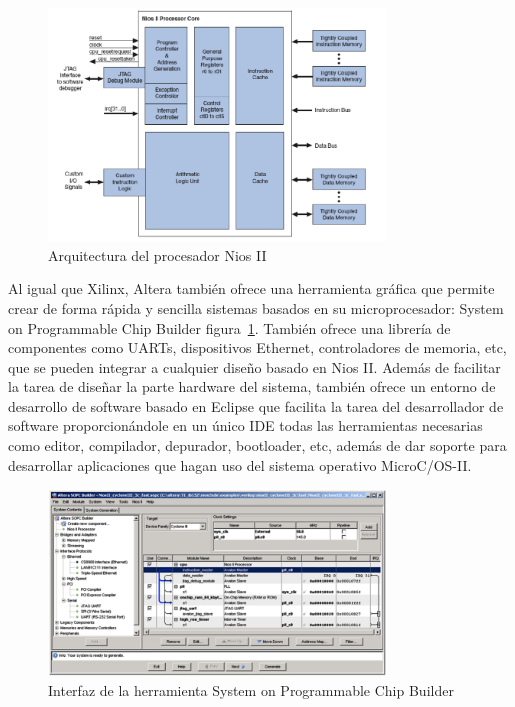 \begin{figure}[h!]
 	\begin{center}
  	\includegraphics[width=0.8\textwidth,keepaspectratio=true]{./images/nios2}
  	\caption{Arquitectura del procesador Nios II}
 	\end{center}
	\end{figure}

Al igual que Xilinx, Altera también ofrece una herramienta gráfica que permite crear de forma rápida y sencilla sistemas basados en su microprocesador: System on Programmable Chip Builder \cite{Etiqueta28}figura~\ref{fig:System on Programmable Chip Builder}. También ofrece una librería de componentes como UARTs, dispositivos Ethernet, controladores de memoria, etc, que se pueden integrar a cualquier diseño basado en Nios II.
Además de facilitar la tarea de diseñar la parte hardware del sistema, también ofrece un entorno de desarrollo de software basado en Eclipse que facilita la tarea del desarrollador de software proporcionándole en un único IDE todas las herramientas necesarias como editor, compilador, depurador, bootloader, etc, además de dar soporte para desarrollar aplicaciones que hagan uso del sistema operativo MicroC/OS-II.

	\begin{figure}[h!]
 	\begin{center}
  	\includegraphics[width=0.8\textwidth,keepaspectratio=true]{./images/herramientasnios2}
  	\caption{Interfaz de la herramienta System on Programmable Chip Builder}
  	\label{fig:System on Programmable Chip Builder}
 	\end{center}
	\end{figure}
\newpage

